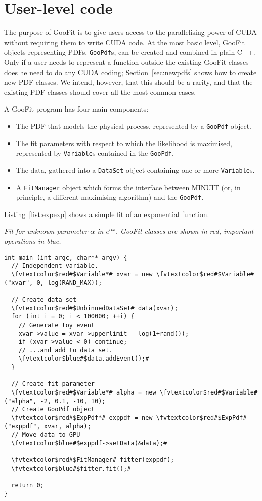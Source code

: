 \section{User-level code}
\label{sec:usercode}

The purpose of GooFit is to give users access to the parallelising power of CUDA
without requiring them to write CUDA code. At the most basic level, GooFit objects
representing PDFs, \texttt{GooPdf}s, can be created and combined in plain C++. Only
if a user needs to represent a function outside the existing GooFit classes does he
need to do any CUDA coding; Section~\ref{sec:newpdfs} shows how to create new PDF classes.
We intend, however, that this should be a rarity, and that the existing PDF classes
should cover all the most common cases. 

A GooFit program has four main components: 
\begin{itemize}
\item The PDF that models the physical process, represented by a \texttt{GooPdf} object.
\item The fit parameters with respect to which the likelihood is maximised,
represented by \texttt{Variable}s contained in the \texttt{GooPdf}. 
\item The data, gathered into a \texttt{DataSet} object containing one or more \texttt{Variable}s.
\item A \texttt{FitManager} object which forms the interface between MINUIT
(or, in principle, a different maximising algorithm) and the \texttt{GooPdf}.
\end{itemize}
Listing~\ref{list:expexp} shows a simple fit of an exponential function.
\begin{listing}
\label{list:expexp} 
\emph{Fit for unknown parameter $\alpha$ in $e^{\alpha x}$. GooFit classes
are shown in red, important operations in blue.}

\begin{Verbatim}[commandchars=\\\$\#]
int main (int argc, char** argv) {
  // Independent variable. 
  \fvtextcolor$red#$Variable*# xvar = new \fvtextcolor$red#$Variable#("xvar", 0, log(RAND_MAX)); 
  
  // Create data set
  \fvtextcolor$red#$UnbinnedDataSet# data(xvar);
  for (int i = 0; i < 100000; ++i) {
    // Generate toy event
    xvar->value = xvar->upperlimit - log(1+rand());
    if (xvar->value < 0) continue;
    // ...and add to data set. 
    \fvtextcolor$blue#$data.addEvent();# 
  }
  
  // Create fit parameter
  \fvtextcolor$red#$Variable*# alpha = new \fvtextcolor$red#$Variable#("alpha", -2, 0.1, -10, 10);
  // Create GooPdf object
  \fvtextcolor$red#$ExpPdf*# exppdf = new \fvtextcolor$red#$ExpPdf#("exppdf", xvar, alpha); 
  // Move data to GPU
  \fvtextcolor$blue#$exppdf->setData(&data);#

  \fvtextcolor$red#$FitManager# fitter(exppdf);
  \fvtextcolor$blue#$fitter.fit();# 

  return 0;
}
\end{Verbatim}
\end{listing}
